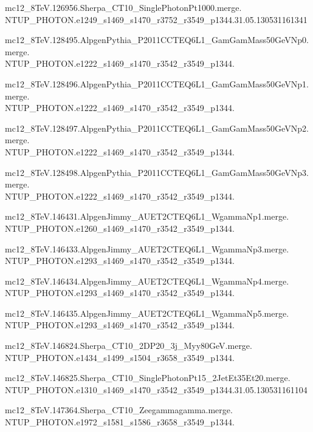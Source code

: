 mc12\_8TeV.126956.Sherpa\_CT10\_SinglePhotonPt1000.merge. \\NTUP\_PHOTON.e1249\_s1469\_s1470\_r3752\_r3549\_p1344.31.05.130531161341

mc12\_8TeV.128495.AlpgenPythia\_P2011CCTEQ6L1\_GamGamMass50GeVNp0.merge. \\NTUP\_PHOTON.e1222\_s1469\_s1470\_r3542\_r3549\_p1344.

mc12\_8TeV.128496.AlpgenPythia\_P2011CCTEQ6L1\_GamGamMass50GeVNp1.merge. \\NTUP\_PHOTON.e1222\_s1469\_s1470\_r3542\_r3549\_p1344.

mc12\_8TeV.128497.AlpgenPythia\_P2011CCTEQ6L1\_GamGamMass50GeVNp2.merge. \\NTUP\_PHOTON.e1222\_s1469\_s1470\_r3542\_r3549\_p1344.

mc12\_8TeV.128498.AlpgenPythia\_P2011CCTEQ6L1\_GamGamMass50GeVNp3.merge. \\NTUP\_PHOTON.e1222\_s1469\_s1470\_r3542\_r3549\_p1344.

mc12\_8TeV.146431.AlpgenJimmy\_AUET2CTEQ6L1\_WgammaNp1.merge. \\NTUP\_PHOTON.e1260\_s1469\_s1470\_r3542\_r3549\_p1344.

mc12\_8TeV.146433.AlpgenJimmy\_AUET2CTEQ6L1\_WgammaNp3.merge. \\NTUP\_PHOTON.e1293\_s1469\_s1470\_r3542\_r3549\_p1344.

mc12\_8TeV.146434.AlpgenJimmy\_AUET2CTEQ6L1\_WgammaNp4.merge. \\NTUP\_PHOTON.e1293\_s1469\_s1470\_r3542\_r3549\_p1344.

mc12\_8TeV.146435.AlpgenJimmy\_AUET2CTEQ6L1\_WgammaNp5.merge. \\NTUP\_PHOTON.e1293\_s1469\_s1470\_r3542\_r3549\_p1344.

mc12\_8TeV.146824.Sherpa\_CT10\_2DP20\_3j\_Myy80GeV.merge. \\NTUP\_PHOTON.e1434\_s1499\_s1504\_r3658\_r3549\_p1344.

mc12\_8TeV.146825.Sherpa\_CT10\_SinglePhotonPt15\_2JetEt35Et20.merge. \\NTUP\_PHOTON.e1310\_s1469\_s1470\_r3542\_r3549\_p1344.31.05.130531161104

mc12\_8TeV.147364.Sherpa\_CT10\_Zeegammagamma.merge. \\NTUP\_PHOTON.e1972\_s1581\_s1586\_r3658\_r3549\_p1344.

